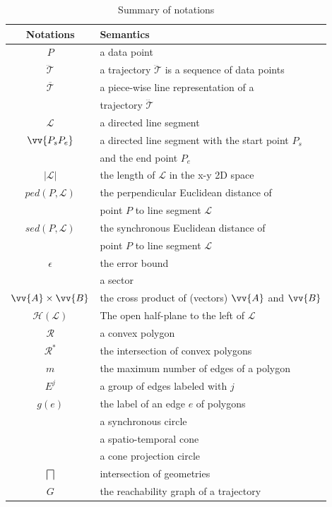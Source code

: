 \begin{table}
	\renewcommand{\arraystretch}{1.35}
	\caption{\small Summary of notations}
	\centering
	\footnotesize
	\begin{tabular}{|c|l|}
		\hline
		{\bf Notations}& {\bf Semantics}   \\
		\hline %
		$P$ & a data point \\
		\hline
		$\dddot{\mathcal{T}}$ & a trajectory $\dddot{\mathcal{T}}$ is a sequence of data points\\
		\hline
		$\overline{\mathcal{T}}$&  {a piece-wise line representation of a }	\\
								& trajectory $\dddot{\mathcal{T}}$		\\
		\hline
		$\mathcal{L}$ & a directed line segment  \\


\hline
		$\vv{P_{s}P_{e}}$ & a directed line segment with the start point $P_s$ \\
        & and the end point $P_e$	\\
        \hline
$|\mathcal{L}|$ &  the length of $\mathcal{L}$ in the x-y 2D space  \\


		\hline
		$ped(P, \mathcal{L})$ &  {the perpendicular Euclidean distance of }	\\
								& point $P$ to line segment $\mathcal{L}$	\\
		\hline
		$sed(P, \mathcal{L})$ & {the synchronous Euclidean distance of }	\\
								& point $P$ to line segment $\mathcal{L}$	\\
		\hline
		$\epsilon$ & the error bound \\
		\hline
		\sector{} & a sector \\
		\hline
		$\vv{A} \times \vv{B}$ & the cross product of (vectors) $\vv{A}$ and $\vv{B}$\\
		\hline
		$\mathcal{H}(\mathcal{L})$ & The open half-plane to the left of $\mathcal{L}$ \\
		\hline
		$\mathcal{R}$& a convex polygon \\
		\hline
		$\mathcal{R}^*$ & the intersection of convex polygons \\
		\hline
		$m$ & the maximum number of edges of a polygon\\
		\hline
		$E^j$ & a group of edges labeled with $j$\\
		\hline
		$g(e)$ & the label of an edge $e$ of polygons \\
		\hline
		\circle{} & a synchronous circle\\
		\hline
		\cone{} & a spatio-temporal cone \\
		\hline
		\pcircle{} & a cone projection circle \\
		\hline
		$\bigsqcap$ & intersection of geometries\\
		\hline
		$G$ &	the reachability graph of a trajectory\\
		\hline
	\end{tabular}
	\label{tab:notations}
	\vspace{-1ex}
\end{table}


